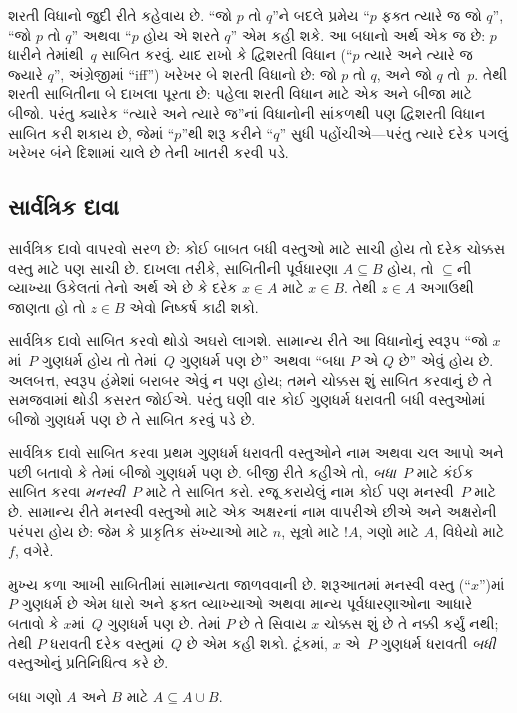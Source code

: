 શરતી વિધાનો જુદી રીતે કહેવાય છે. ``જો $p$ તો $q$''ને બદલે
પ્રમેય ``$p$ ફક્ત ત્યારે જ જો $q$'', ``જો $p$ તો $q$'' અથવા
``$p$ હોય એ શરતે $q$'' એમ કહી શકે. આ બધાનો અર્થ એક જ છે:
$p$ ધારીને તેમાંથી~$q$ સાબિત કરવું. યાદ રાખો કે દ્વિશરતી
વિધાન (``$p$ ત્યારે અને ત્યારે જ જ્યારે $q$'', અંગ્રેજીમાં ``iff'') ખરેખર બે
શરતી વિધાનો છે: જો $p$ તો $q$, અને જો $q$ તો~$p$. તેથી
શરતી સાબિતીના બે દાખલા પૂરતા છે: પહેલા શરતી વિધાન માટે એક
અને બીજા માટે બીજો. પરંતુ ક્યારેક ``ત્યારે અને ત્યારે જ''નાં
વિધાનોની સાંકળથી પણ દ્વિશરતી વિધાન સાબિત કરી શકાય છે, જેમાં
``$p$''થી શરૂ કરીને ``$q$'' સુધી પહોંચીએ---પરંતુ ત્યારે
દરેક પગલું ખરેખર બંને દિશામાં ચાલે છે તેની ખાતરી કરવી પડે.

\subsection{સાર્વત્રિક દાવા}

સાર્વત્રિક દાવો વાપરવો સરળ છે: કોઈ બાબત બધી વસ્તુઓ માટે
સાચી હોય તો દરેક ચોક્કસ વસ્તુ માટે પણ સાચી છે. દાખલા તરીકે,
સાબિતીની પૂર્વધારણા $A \subseteq B$ હોય, તો $\subseteq$ની
વ્યાખ્યા ઉકેલતાં તેનો અર્થ એ છે કે દરેક $x \in A$ માટે
$x \in B$. તેથી $z \in A$ અગાઉથી જાણતા હો તો
$z \in B$ એવો નિષ્કર્ષ કાઢી શકો.

સાર્વત્રિક દાવો સાબિત કરવો થોડો અઘરો લાગશે. સામાન્ય રીતે આ
વિધાનોનું સ્વરૂપ ``જો $x$માં~$P$ ગુણધર્મ હોય તો તેમાં~$Q$
ગુણધર્મ પણ છે'' અથવા ``બધા $P$ એ $Q$ છે'' એવું હોય છે.
અલબત્ત, સ્વરૂપ હંમેશાં બરાબર એવું ન પણ હોય; તમને ચોક્કસ
શું સાબિત કરવાનું છે તે સમજવામાં થોડી કસરત જોઈએ. પરંતુ ઘણી
વાર કોઈ ગુણધર્મ ધરાવતી બધી વસ્તુઓમાં બીજો ગુણધર્મ પણ છે તે
સાબિત કરવું પડે છે.

સાર્વત્રિક દાવો સાબિત કરવા પ્રથમ ગુણધર્મ ધરાવતી વસ્તુઓને નામ
અથવા ચલ આપો અને પછી બતાવો કે તેમાં બીજો ગુણધર્મ પણ છે.
બીજી રીતે કહીએ તો, \emph{બધા}~$P$ માટે કંઈક સાબિત કરવા
\emph{મનસ્વી}~$P$ માટે તે સાબિત કરો. રજૂ કરાયેલું નામ કોઈ
પણ મનસ્વી~$P$ માટે છે. સામાન્ય રીતે મનસ્વી વસ્તુઓ માટે
એક અક્ષરનાં નામ વાપરીએ છીએ અને અક્ષરોની પરંપરા હોય છે:
જેમ કે પ્રાકૃતિક સંખ્યાઓ માટે $n$, સૂત્રો માટે $!A$,
ગણો માટે $A$, વિધેયો માટે $f$, વગેરે.

મુખ્ય કળા આખી સાબિતીમાં સામાન્યતા જાળવવાની છે. શરૂઆતમાં મનસ્વી
વસ્તુ (``$x$'')માં~$P$ ગુણધર્મ છે એમ ધારો અને ફક્ત વ્યાખ્યાઓ
અથવા માન્ય પૂર્વધારણાઓના આધારે બતાવો કે $x$માં~$Q$ ગુણધર્મ
પણ છે. તેમાં $P$ છે તે સિવાય $x$ ચોક્કસ શું છે તે નક્કી
કર્યું નથી; તેથી $P$ ધરાવતી દરેક વસ્તુમાં~$Q$ છે એમ કહી
શકો. ટૂંકમાં, $x$ એ~$P$ ગુણધર્મ ધરાવતી \emph{બધી} વસ્તુઓનું
પ્રતિનિધિત્વ કરે છે.

\begin{prop}
  બધા ગણો $A$ અને $B$ માટે $A \subseteq A \cup B$.
\end{prop}

